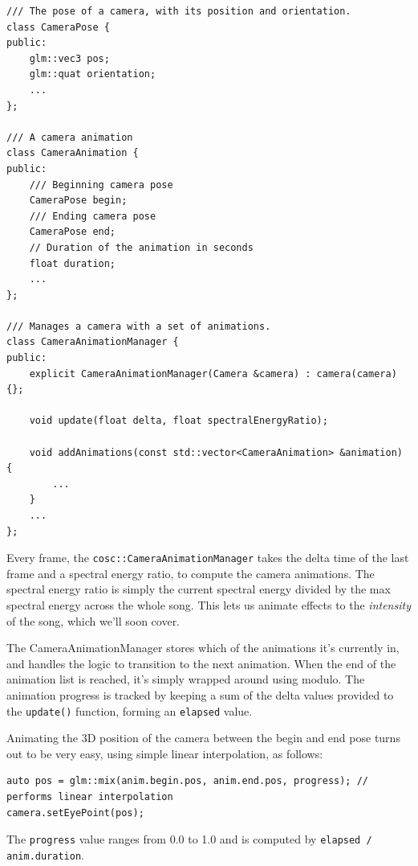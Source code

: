 \documentclass[11pt]{article}
\begin{document}
\begin{verbatim}
/// The pose of a camera, with its position and orientation.
class CameraPose {
public:
    glm::vec3 pos;
    glm::quat orientation;
    ...
};

/// A camera animation
class CameraAnimation {
public:
    /// Beginning camera pose
    CameraPose begin;
    /// Ending camera pose
    CameraPose end;
    // Duration of the animation in seconds
    float duration;
    ...
};

/// Manages a camera with a set of animations.
class CameraAnimationManager {
public:
    explicit CameraAnimationManager(Camera &camera) : camera(camera) {};

    void update(float delta, float spectralEnergyRatio);

    void addAnimations(const std::vector<CameraAnimation> &animation) {
        ...
    }
    ...
};
\end{verbatim}


Every frame, the \verb|cosc::CameraAnimationManager| takes the delta time of the last frame and a spectral
energy ratio, to compute the camera animations. The spectral energy ratio is simply the current spectral
energy divided by the max spectral energy across the whole song. This lets us animate effects to the
\textit{intensity} of the song, which we'll soon cover.

The CameraAnimationManager stores which of the animations it's currently in, and handles the logic to
transition to the next animation. When the end of the animation list is reached, it's simply wrapped around
using modulo. The animation progress is tracked by keeping a sum of the delta values provided to the
\verb|update()| function, forming an \verb|elapsed| value.

Animating the 3D position of the camera between the begin and end pose turns out to be very easy, using simple
linear interpolation, as follows:

\begin{verbatim}
auto pos = glm::mix(anim.begin.pos, anim.end.pos, progress); // performs linear interpolation
camera.setEyePoint(pos);
\end{verbatim}

The \verb|progress| value ranges from 0.0 to 1.0 and is computed by \verb|elapsed / anim.duration|.
\end{document}
